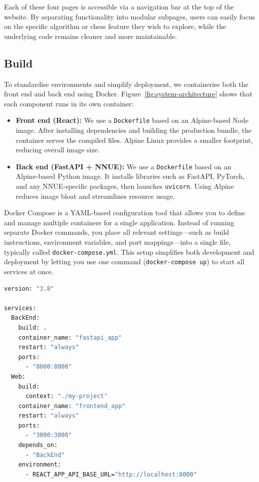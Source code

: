 \documentclass[12pt,a4paper]{article}
\begin{document}
\noindent Each of these four pages is accessible via a navigation bar at the top of the website. By separating functionality into modular subpages, users can easily focus on the specific algorithm or chess feature they wish to explore, while the underlying code remains cleaner and more maintainable.


\subsection{Build}

To standardise environments and simplify deployment, we containerise both the front end and back end using Docker. 
Figure~\ref{fig:system-architecture} shows that each component runs in its own container:

\begin{itemize}
  \item \textbf{Front end (React):} We use a \texttt{Dockerfile} based on an Alpine-based Node image. After installing dependencies and building the production bundle, the container serves the compiled files. Alpine Linux provides a smaller footprint, reducing overall image size.

  \item \textbf{Back end (FastAPI + NNUE):} We use a \texttt{Dockerfile} based on an Alpine-based Python image. It installs libraries such as FastAPI, PyTorch, and any NNUE-specific packages, then launches \texttt{uvicorn}. Using Alpine reduces image bloat and streamlines resource usage.
\end{itemize}

Docker Compose is a YAML-based configuration tool that allows you to define and manage multiple containers for a single application. Instead of running separate Docker commands, you place all relevant settings—such as build instructions, environment variables, and port mappings—into a single file, typically called \texttt{docker-compose.yml}. This setup simplifies both development and deployment by letting you use one command (\texttt{docker-compose up}) to start all services at once.

\begin{lstlisting}[language=bash,caption={docker-compose.yml},label={lst:docker-compose at project root}]
version: "3.8"

services:
  BackEnd:
    build: .
    container_name: "fastapi_app"
    restart: "always"
    ports:
      - "8000:8000"
  Web:
    build:
      context: "./my-project"
    container_name: "frontend_app"
    restart: "always"
    ports:
      - "3000:3000"
    depends_on:
      - "BackEnd"
    environment:
      - REACT_APP_API_BASE_URL="http://localhost:8000"
\end{lstlisting}
\end{document}
